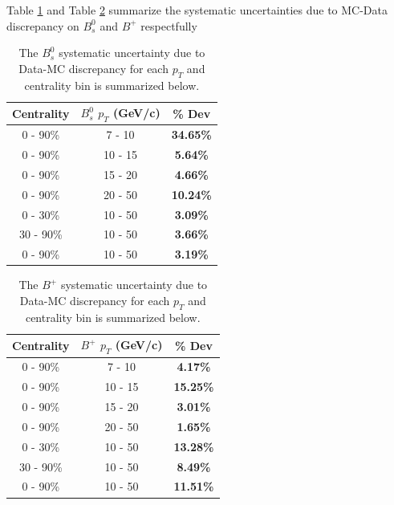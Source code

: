 Table \ref{BsMCDataSyst} and Table \ref{BPMCDataSyst} summarize the systematic uncertainties due to MC-Data discrepancy on $B^0_s$ and $B^+$ respectfully


\begin{table}[h]
\begin{center}
\caption{The $B^0_s$ systematic uncertainty due to Data-MC discrepancy for each $p_T$ and centrality bin is summarized below.}
\vspace{1em}
\label{BsMCDataSyst}
  \begin{tabular}{| c | c |c |}
    \hline
     Centrality & $B^0_s$ $p_T$ (GeV/c) & \% Dev \\
    \hline
    \hline
0 - 90\% & 7 - 10 &   \textbf{34.65\% }     \\ 
0 - 90\% & 10 - 15 & \textbf{5.64\% }    \\ 
0 - 90\% & 15 - 20 &  \textbf{4.66\% }     \\ 
0 - 90\% & 20 - 50 &  \textbf{10.24\% }    \\ 
0 - 30\% & 10 - 50 &   \textbf{3.09\% }  \\ 
30 - 90\% & 10 - 50 & \textbf{3.66\% }    \\ 
0 - 90\% & 10 - 50 &  \textbf{3.19\% }   \\ 
    \hline
    \hline
\end{tabular}
\end{center}
\end{table}



\begin{table}[h]
\begin{center}
\caption{The $B^+$ systematic uncertainty due to Data-MC discrepancy for each $p_T$ and centrality bin is summarized below.}
\vspace{1em}
\label{BPMCDataSyst}
  \begin{tabular}{| c | c |c |}
    \hline
     Centrality & $B^+$ $p_T$ (GeV/c) & \% Dev \\
    \hline
    \hline
0 - 90\% & 7 - 10 &   \textbf{4.17\% }     \\ 
0 - 90\% & 10 - 15 & \textbf{15.25\% }    \\ 
0 - 90\% & 15 - 20 &  \textbf{3.01\% }     \\ 
0 - 90\% & 20 - 50 &  \textbf{1.65\% }    \\ 
0 - 30\% & 10 - 50 &   \textbf{13.28\% }  \\ 
30 - 90\% & 10 - 50 & \textbf{8.49\% }    \\ 
0 - 90\% & 10 - 50 &  \textbf{11.51\% }   \\ 
    \hline
    \hline
\end{tabular}
\end{center}
\end{table}


